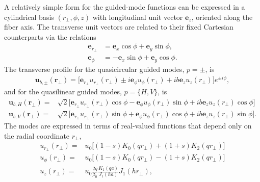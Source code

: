 \documentclass[preprint, aps,pra,onecolumn]{revtex4-1} %
\newcommand{\mbf}[1]{\mathbf{#1}}
\begin{document}
\begin{appendix}
A relatively simple form for the guided-mode functions can be expressed in a cylindrical basis $(r_\perp, \phi, z)$ with longitudinal unit vector $\mathbf{e}_z$, oriented along the fiber axis.  
The transverse unit vectors are related to their fixed Cartesian counterparts via the relations
\begin{subequations}
	\begin{align}
		\mathbf{e}_{r_{\!\perp}}     &= \mathbf{e}_x \cos \phi + \mathbf{e}_y \sin \phi, \\
		\mathbf{e}_\phi &= - \mathbf{e}_x \sin \phi + \mathbf{e}_y \cos \phi.
	\end{align}
\end{subequations}
The transverse profile for the quasicircular guided modes, $p = \pm$, is
	\begin{align} \label{Eq::QuasicircularModes}
		\mbf{u}_{b,\pm}(\mathbf{r}_\perp) = \big[\mathbf{e}_{r_{\!\perp}} u_{r_{\!\perp}}(r_\perp) \pm i \mathbf{e}_\phi u_\phi(r_\perp) +  i b \mathbf{e}_z  u_z(r_\perp) \big]e^{ \pm i \phi}, 
	\end{align}
and for the quasilinear guided modes, $p = \{H,V\}$, is
	\begin{subequations} \label{Eq::QuasilinearModes}
	\begin{align}
		\mbf{u}_{b,H}(\mathbf{r}_\perp) = & \sqrt{2} \big[ \mathbf{e}_{r_{\!\perp}} u_{r_{\!\perp}}(r_\perp) \cos \phi - \mathbf{e}_\phi u_\phi(r_\perp) \sin \phi +  ib \mathbf{e}_z  u_z(r_\perp) \cos \phi \big] \\
		\mbf{u}_{b,V}(\mathbf{r}_\perp) = & \sqrt{2} \big[ \mathbf{e}_{r_{\!\perp}} u_{r_{\!\perp}}(r_\perp) \sin \phi + \mathbf{e}_\phi u_\phi(r_\perp) \cos \phi +  ib \mathbf{e}_z  u_z(r_\perp) \sin \phi \big]. 
	\end{align}
	\end{subequations}
The modes are expressed in terms of real-valued functions that depend only on the radial coordinate $r_\perp$,
	\begin{subequations} \label{Eq::ProfileFunctions}
	\begin{align} 
		u_{r_{\!\perp}}(r_\perp) =& u_0 \big[ (1-s) K_0(q{r_{\!\perp}}) + (1+s)K_2(q{r_{\!\perp}})\big] \\
		u_\phi(r_\perp) =& u_0\big[ (1-s) K_0(q{r_{\!\perp}}) - (1+s)K_2(q{r_{\!\perp}})\big] \\
		u_z(r_\perp) =& u_0 \frac{2 q}{\beta_0} \frac{K_1(qa)}{J_1(ha)} J_1(h{r_{\!\perp}}), \label{Eq::zprofile}
	\end{align}
	\end{subequations}

\end{appendix}
\end{document}
